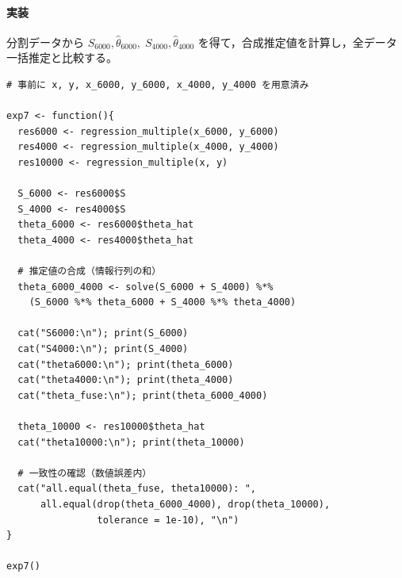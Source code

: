 \paragraph{実装}
分割データから
\(
S_{6000},\hat\theta_{6000},\;S_{4000},\hat\theta_{4000}
\)
を得て，合成推定値を計算し，全データ一括推定と比較する。

\begin{lstlisting}
# 事前に x, y, x_6000, y_6000, x_4000, y_4000 を用意済み

exp7 <- function(){
  res6000 <- regression_multiple(x_6000, y_6000)
  res4000 <- regression_multiple(x_4000, y_4000)
  res10000 <- regression_multiple(x, y)

  S_6000 <- res6000$S
  S_4000 <- res4000$S
  theta_6000 <- res6000$theta_hat
  theta_4000 <- res4000$theta_hat

  # 推定値の合成（情報行列の和）
  theta_6000_4000 <- solve(S_6000 + S_4000) %*%
    (S_6000 %*% theta_6000 + S_4000 %*% theta_4000)

  cat("S6000:\n"); print(S_6000)
  cat("S4000:\n"); print(S_4000)
  cat("theta6000:\n"); print(theta_6000)
  cat("theta4000:\n"); print(theta_4000)
  cat("theta_fuse:\n"); print(theta_6000_4000)

  theta_10000 <- res10000$theta_hat
  cat("theta10000:\n"); print(theta_10000)

  # 一致性の確認（数値誤差内）
  cat("all.equal(theta_fuse, theta10000): ",
      all.equal(drop(theta_6000_4000), drop(theta_10000),
                tolerance = 1e-10), "\n")
}

exp7()
\end{lstlisting}

